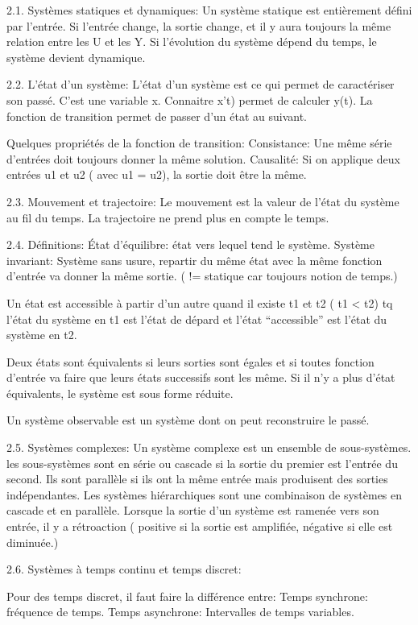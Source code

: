 2.1. Systèmes statiques et dynamiques:
Un système statique est entièrement défini par l’entrée. Si l’entrée change, la sortie change, et il y aura toujours la même relation entre les U et les Y. Si l’évolution du système dépend du temps, le système devient dynamique.

2.2. L’état d’un système:
L’état d’un système est ce qui permet de caractériser son passé. C’est une variable x. Connaitre x’t) permet de calculer y(t).
La fonction de transition permet de passer d’un état au suivant.

Quelques propriétés de la fonction de transition:
Consistance: Une même série d’entrées doit toujours donner la même solution.
Causalité: Si on applique deux entrées u1 et u2 ( avec u1 = u2), la sortie doit être la même.

2.3. Mouvement et trajectoire:
Le mouvement est la valeur de l’état du système au fil du temps.
La trajectoire ne  prend plus en compte le temps.

2.4. Définitions:
État d’équilibre: état vers lequel tend le système.
Système invariant: Système sans usure, repartir du même état avec la même fonction d’entrée va donner la même sortie. ( != statique car toujours notion de temps.)

Un état est accessible à partir d’un autre quand il existe t1 et t2 ( t1 < t2) tq l’état du système en t1 est l’état de dépard et l’état “accessible” est l’état du système en t2.

Deux états sont équivalents si leurs sorties sont égales et si toutes fonction d’entrée va faire que leurs états successifs sont les même. Si il n’y a plus d’état équivalents, le système est sous forme réduite.

Un système observable est un système dont on peut reconstruire le passé.

2.5. Systèmes complexes:
Un système complexe est un ensemble de sous-systèmes.
les sous-systèmes sont en série ou cascade si la sortie du premier est l’entrée du second.
Ils sont parallèle si ils ont la même entrée mais produisent des sorties indépendantes.
Les systèmes hiérarchiques sont une combinaison de systèmes en cascade et en parallèle.
Lorsque la sortie d’un système est ramenée vers son entrée, il y a rétroaction ( positive si la sortie est amplifiée, négative si elle est diminuée.)

2.6. Systèmes à temps continu et temps discret:

Pour des temps discret, il faut faire la différence entre:
Temps synchrone: fréquence de temps.
Temps asynchrone: Intervalles de temps variables.

